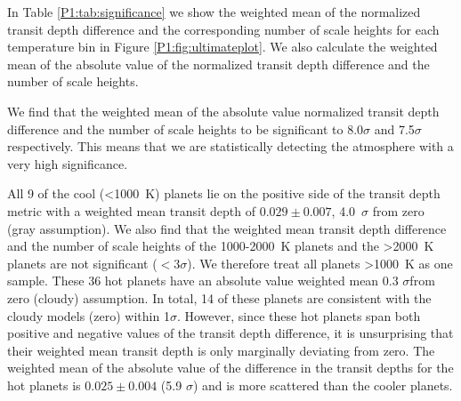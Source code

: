 In Table \ref{P1:tab:significance} we show the weighted mean of the normalized transit depth difference and the corresponding number of scale heights for each temperature bin in Figure \ref{P1:fig:ultimateplot}. We also calculate the weighted mean of the absolute value of the normalized transit depth difference and the number of scale heights.

We find that the weighted mean of the absolute value normalized transit depth difference and the number of scale heights to be significant to 8.0$\sigma$ and 7.5$\sigma$ respectively. This means that we are statistically detecting the atmosphere with a very high significance.

All 9 of the cool (<1000~K) planets lie on the positive side of the transit depth metric with a weighted mean transit depth of $0.029 \pm 0.007$, 4.0~$\sigma$ from zero (gray assumption). We also find that the weighted mean transit depth difference and the number of scale heights of the 1000-2000~K planets and the >2000~K planets are not significant ($<3\sigma$). We therefore treat all planets >1000~K as one sample. These 36 hot planets have an absolute value weighted mean 0.3 $\sigma$from zero (cloudy) assumption. In total, 14 of these planets are consistent with the cloudy models (zero) within 1$\sigma$. However, since these hot planets span both positive and negative values of the transit depth difference, it is unsurprising that their weighted mean transit depth is only marginally deviating from zero. The weighted mean of the absolute value of the difference in the transit depths for the hot planets is $0.025 \pm 0.004$ (5.9 $\sigma$) and is more scattered than the cooler planets.

